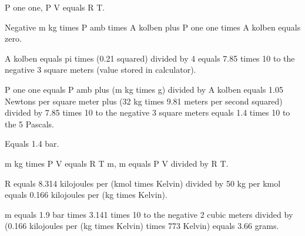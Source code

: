 P one one, P V equals R T.

Negative m kg times P amb times A kolben plus P one one times A kolben equals zero.

A kolben equals pi times (0.21 squared) divided by 4 equals 7.85 times 10 to the negative 3 square meters (value stored in calculator).

P one one equals P amb plus (m kg times g) divided by A kolben equals 1.05 Newtons per square meter plus (32 kg times 9.81 meters per second squared) divided by 7.85 times 10 to the negative 3 square meters equals 1.4 times 10 to the 5 Pascals.

Equals 1.4 bar.

m kg times P V equals R T m, m equals P V divided by R T.

R equals 8.314 kilojoules per (kmol times Kelvin) divided by 50 kg per kmol equals 0.166 kilojoules per (kg times Kelvin).

m equals 1.9 bar times 3.141 times 10 to the negative 2 cubic meters divided by (0.166 kilojoules per (kg times Kelvin) times 773 Kelvin) equals 3.66 grams.
